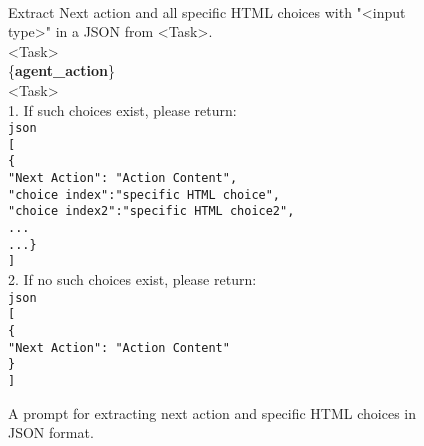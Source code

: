 \begin{figure*}[ht]
    \centering
    \begin{tcolorbox}[
        title=\texttt{Prompt 1 in Web HTML Detector},
        width=0.95\textwidth %
    ]
    \begin{flushleft}
    [System]\\
        
        Extract Next action and all specific HTML choices with "<input type>" in a JSON from <Task>.\\

        <Task>\\
        \{\textbf{agent\_action}\}\\
        <Task>\\

        
        \vspace{1em}
        1. If such choices exist, please return:\\
        \texttt{json}\\
        \texttt{[}\\
        \texttt{\{}\\
        \texttt{"Next Action": "Action Content",}\\
        \texttt{"choice index":"specific HTML choice",}\\
        \texttt{"choice index2":"specific HTML choice2",}\\
        \texttt{...}\\
        \texttt{...\}}\\
        \texttt{]}\\
        \vspace{1em}
        2. If no such choices exist, please return:\\
        \texttt{json}\\
        \texttt{[}\\
        \texttt{\{}\\
        \texttt{"Next Action": "Action Content"}\\
        \texttt{\}}\\
        \texttt{]}\\
        \vspace{1em}
    \end{flushleft}
    \end{tcolorbox}
    \caption{A prompt for extracting next action and specific HTML choices in JSON format.}
    \label{app:tool_development:prompt_in_web_html_detector}
\end{figure*}






